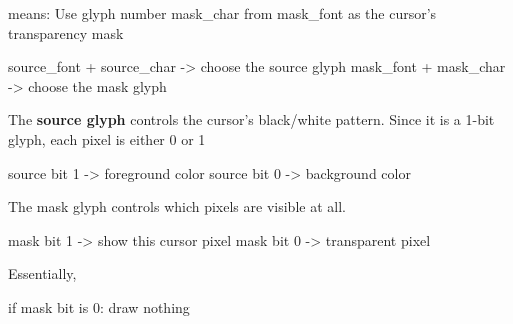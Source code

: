 \documentclass{report}
\begin{document}
\begin{itemize}
            means: Use glyph number mask\_char from mask\_font as the cursor’s transparency mask
            \bigbreak \noindent 
            \begin{cppcode}
                source_font + source_char  -> choose the source glyph
                mask_font   + mask_char    -> choose the mask glyph
            \end{cppcode}
            \bigbreak \noindent 
            The \textbf{source glyph} controls the cursor’s black/white pattern. Since it is a 1-bit glyph, each pixel is either 0 or 1
            \bigbreak \noindent 
            \begin{cppcode}
                source bit 1 -> foreground color
                source bit 0 -> background color
            \end{cppcode}
            \bigbreak \noindent 
            The mask glyph controls which pixels are visible at all.
            \bigbreak \noindent 
            \begin{cppcode}
                mask bit 1 -> show this cursor pixel
                mask bit 0 -> transparent pixel
            \end{cppcode}
            \bigbreak \noindent 
            Essentially,
            \bigbreak \noindent 
            \begin{cppcode}
                if mask bit is 0:
                    draw nothing


\end{cppcode}
\end{itemize}
\end{document}
